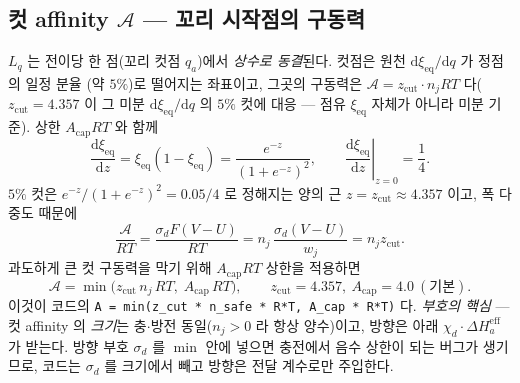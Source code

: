 \documentclass[11pt,a4paper]{article}
\newcommand{\dd}{\mathrm{d}}
\newcommand{\eff}{\mathrm{eff}}
\newcommand{\eq}{\mathrm{eq}}
\newcommand{\code}[1]{\texttt{#1}}
\begin{document}
\subsection{컷 affinity $\mathcal A$ — 꼬리 시작점의 구동력}
$L_q$ 는 전이당 한 점(꼬리 컷점 $q_a$)에서 \emph{상수로 동결}된다. 컷점은 원천 $\dd\xi_\eq/\dd q$ 가 정점의 일정 분율
(약 $5\%$)로 떨어지는 좌표이고, 그곳의 구동력은 $\mathcal A=z_\mathrm{cut}\cdot n_jRT$ 다($z_\mathrm{cut}=4.357$ 이
그 미분 $\dd\xi_\eq/\dd q$ 의 $5\%$ 컷에 대응 — 점유 $\xi_\eq$ 자체가 아니라 미분 기준). 상한 $A_\mathrm{cap}RT$ 와 함께
\begin{equation}
\frac{\dd\xi_\eq}{\dd z}=\xi_\eq(1-\xi_\eq)
=\frac{e^{-z}}{(1+e^{-z})^2},\qquad
\left.\frac{\dd\xi_\eq}{\dd z}\right|_{z=0}=\frac14.
\label{eq:AcutderiveA}
\end{equation}
$5\%$ 컷은 $e^{-z}/(1+e^{-z})^2=0.05/4$ 로 정해지는 양의 근 $z=z_\mathrm{cut}\approx4.357$ 이고, 폭 다중도 때문에
\begin{equation}
\frac{\mathcal A}{RT}=\frac{\sigma_dF(V-U)}{RT}
=n_j\,\frac{\sigma_d(V-U)}{w_j}
=n_j z_\mathrm{cut}.
\label{eq:AcutderiveB}
\end{equation}
과도하게 큰 컷 구동력을 막기 위해 $A_\mathrm{cap}RT$ 상한을 적용하면
\begin{equation}
\mathcal A=\min\!\big(z_\mathrm{cut}\,n_j\,RT,\;A_\mathrm{cap}\,RT\big),
\qquad z_\mathrm{cut}=4.357,\ A_\mathrm{cap}=4.0\ (\text{기본}).
\label{eq:Acut}
\end{equation}
이것이 코드의 \code{A = min(z\_cut * n\_safe * R*T, A\_cap * R*T)} 다. \emph{부호의 핵심} — 컷 affinity 의 \emph{크기}는
충$\cdot$방전 동일($n_j>0$ 라 항상 양수)이고, 방향은 아래 $\chi_d\cdot\Delta H_a^\eff$ 가 받는다. 방향 부호 $\sigma_d$ 를
$\min$ 안에 넣으면 충전에서 음수 상한이 되는 버그가 생기므로, 코드는 $\sigma_d$ 를 크기에서 빼고 방향은 전달 계수로만
주입한다.
\end{document}
